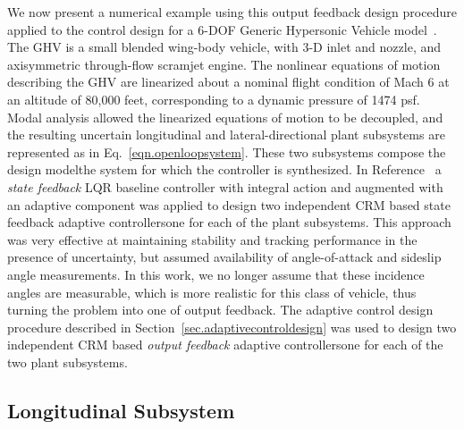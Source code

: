 \documentclass[]{../sty/JGCD}
\theoremstyle{examplestyle}
\begin{document}
  We now present a numerical example using this output feedback design procedure applied to the control design for a 6-DOF Generic Hypersonic Vehicle model\ \cite{wiese.adaptive.2013,rollins.nonlinear.2013}.
  The GHV is a small blended wing-body vehicle, with 3-D inlet and nozzle, and axisymmetric through-flow scramjet engine.
  The nonlinear equations of motion describing the GHV are linearized about a nominal flight condition of Mach 6 at an altitude of 80,000 feet, corresponding to a dynamic pressure of 1474 psf.
  Modal analysis allowed the linearized equations of motion to be decoupled, and the resulting uncertain longitudinal and lateral-directional plant subsystems are represented as in Eq.\ \eqref{eqn.openloopsystem}.
  These two subsystems compose the design model\textemdash{}the system for which the controller is synthesized.
  In Reference\ \cite{wiese.adaptive.2013} a \textit{state feedback} LQR baseline controller with integral action and augmented with an adaptive component was applied to design two independent CRM based state feedback adaptive controllers\textemdash{}one for each of the plant subsystems.
  This approach was very effective at maintaining stability and tracking performance in the presence of uncertainty, but assumed availability of angle-of-attack and sideslip angle measurements.
  In this work, we no longer assume that these incidence angles are measurable, which is more realistic for this class of vehicle, thus turning the problem into one of output feedback.
  The adaptive control design procedure described in Section~\ref{sec.adaptivecontroldesign} was used to design two independent CRM based \textit{output feedback} adaptive controllers\textemdash{}one for each of the two plant subsystems.

  \subsection{Longitudinal Subsystem}
\end{document}

